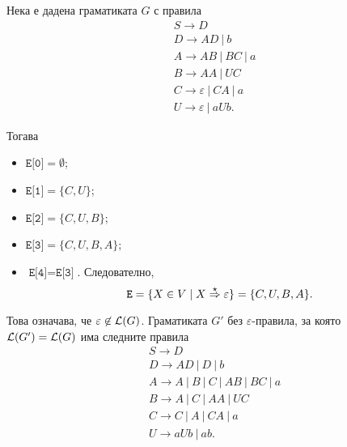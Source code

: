 {\scriptsize
\begin{multicols}{2}
  \begin{example}
  Нека е дадена граматиката $G$ с правила
  \begin{align*}
    & S \to D\\
    & D \to AD\ |\ b\\
    & A \to AB\ |\ BC\ |\ a\\
    & B \to AA\ |\ UC\\
    & C \to \varepsilon\ |\ CA\ |\ a\\
    & U \to \varepsilon\ |\ aUb.
  \end{align*}

  Тогава
  \begin{itemize}[-]
  \item
    $\texttt{E[0]} = \emptyset$;
  \item
    $\texttt{E[1]} = \{C,U\}$;
  \item
    $\texttt{E[2]} = \{C,U,B\}$;
  \item
    $\texttt{E[3]} = \{C,U,B,A\}$;
  \item
    $\texttt{E[4]} = \texttt{E[3]}$. Следователно,
    \[\texttt{E} = \{X \in V \mid X \stackrel{{\star}}{\Rightarrow} \varepsilon\} = \{C,U,B,A\}.\]
  \end{itemize}
  
  Това означава, че $\varepsilon \not\in \mathcal{L}(G)$.
  Граматиката $G'$ без $\varepsilon$-правила, за която $\mathcal{L}(G') = \mathcal{L}(G)$ има следните правила
  \begin{align*}
    & S \to D \\
    & D\to AD\ |\ D\ |\ b \\
    & A \to A\ |\ B\ |\ C\ |\ AB\ |\ BC\ |\ a \\
    & B\to A\ |\ C\ |\ AA\ |\ UC\\
    & C \to C\ |\ A\ |\ CA\ |\ a\\
    & U \to aUb\ |\ ab.
  \end{align*}
\end{example}
\end{multicols}

}

